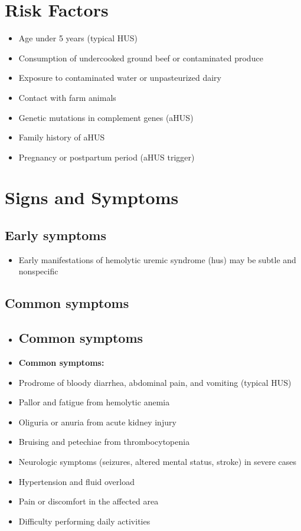 \section{Risk Factors}

\begin{itemize}[noitemsep]
  \item Age under 5 years (typical HUS)
  \item Consumption of undercooked ground beef or contaminated produce
  \item Exposure to contaminated water or unpasteurized dairy
  \item Contact with farm animals
  \item Genetic mutations in complement genes (aHUS)
  \item Family history of aHUS
  \item Pregnancy or postpartum period (aHUS trigger)
\end{itemize}

\section{Signs and Symptoms}

\subsection{Early symptoms}
\begin{itemize}[noitemsep]
  \item Early manifestations of hemolytic uremic syndrome (hus) may be subtle and nonspecific
\end{itemize}

\subsection{Common symptoms}
\begin{itemize}[noitemsep]
  \item \subsection{Common symptoms}
  \item \textbf{Common symptoms:}
  \item Prodrome of bloody diarrhea, abdominal pain, and vomiting (typical HUS)
  \item Pallor and fatigue from hemolytic anemia
  \item Oliguria or anuria from acute kidney injury
  \item Bruising and petechiae from thrombocytopenia
  \item Neurologic symptoms (seizures, altered mental status, stroke) in severe cases
  \item Hypertension and fluid overload
  \item Pain or discomfort in the affected area
  \item Difficulty performing daily activities
\end{itemize}

